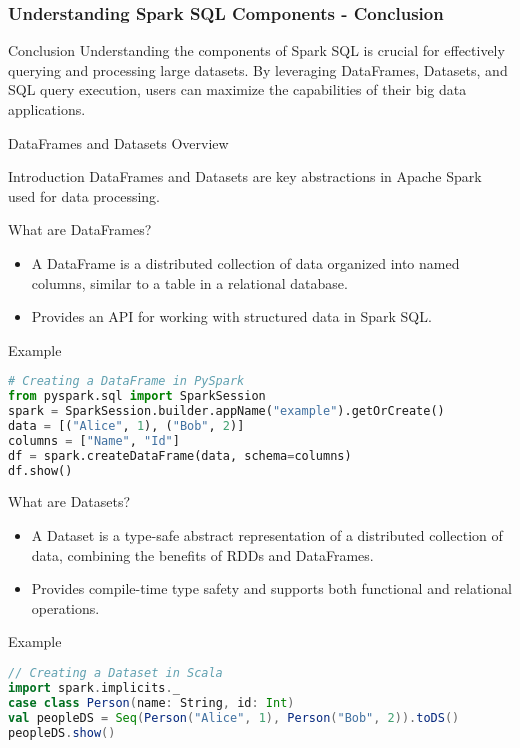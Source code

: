 \documentclass[aspectratio=169]{beamer}
\begin{document}
\begin{frame}[fragile]
    \frametitle{Understanding Spark SQL Components - Conclusion}
    \begin{block}{Conclusion}
        Understanding the components of Spark SQL is crucial for effectively querying and processing large datasets. 
        By leveraging DataFrames, Datasets, and SQL query execution, users can maximize the capabilities 
        of their big data applications.
    \end{block}
\end{frame}

\begin{frame}{DataFrames and Datasets Overview}
    \begin{block}{Introduction}
        DataFrames and Datasets are key abstractions in Apache Spark used for data processing.
    \end{block}
\end{frame}

\begin{frame}[fragile]{What are DataFrames?}
    \begin{itemize}
        \item A DataFrame is a distributed collection of data organized into named columns, similar to a table in a relational database.
        \item Provides an API for working with structured data in Spark SQL.
    \end{itemize}
    
    \begin{block}{Example}
        \begin{lstlisting}[language=Python]
# Creating a DataFrame in PySpark
from pyspark.sql import SparkSession
spark = SparkSession.builder.appName("example").getOrCreate()
data = [("Alice", 1), ("Bob", 2)]
columns = ["Name", "Id"]
df = spark.createDataFrame(data, schema=columns)
df.show()
        \end{lstlisting}
    \end{block}
\end{frame}

\begin{frame}[fragile]{What are Datasets?}
    \begin{itemize}
        \item A Dataset is a type-safe abstract representation of a distributed collection of data, combining the benefits of RDDs and DataFrames.
        \item Provides compile-time type safety and supports both functional and relational operations.
    \end{itemize}
    
    \begin{block}{Example}
        \begin{lstlisting}[language=Scala]
// Creating a Dataset in Scala
import spark.implicits._
case class Person(name: String, id: Int)
val peopleDS = Seq(Person("Alice", 1), Person("Bob", 2)).toDS()
peopleDS.show()
        \end{lstlisting}
    \end{block}
\end{frame}
\end{document}
